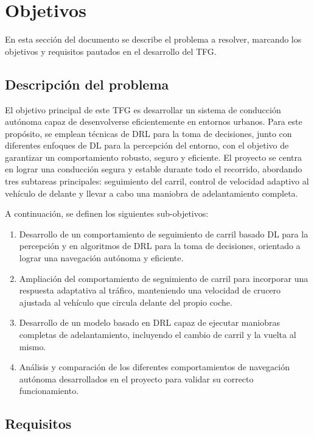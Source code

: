 \chapter{Objetivos}
\label{cap:capitulo2}

En esta sección del documento se describe el problema a resolver, marcando los objetivos y requisitos pautados en el desarrollo del \ac{TFG}.

\section{Descripción del problema}
\label{sec:descripcion}

El objetivo principal de este \ac{TFG} es desarrollar un sistema de conducción autónoma capaz de desenvolverse eficientemente en entornos urbanos. Para este propósito, se emplean técnicas de \ac{DRL} para la toma de decisiones, junto con diferentes enfoques de \ac{DL} para la percepción del entorno, con el objetivo de garantizar un comportamiento robusto, seguro y eficiente. El proyecto se centra en lograr una conducción segura y estable durante todo el recorrido, abordando tres subtareas principales: seguimiento del carril, control de velocidad adaptivo al vehículo de delante y llevar a cabo una maniobra de adelantamiento completa.

A continuación, se definen los siguientes sub-objetivos: 

\begin{enumerate}
\item Desarrollo de un comportamiento de seguimiento de carril basado \ac{DL} para la percepción y en algoritmos de \ac{DRL} para la toma de decisiones, orientado a lograr una navegación autónoma y eficiente.
\item Ampliación del comportamiento de seguimiento de carril para incorporar una respuesta adaptativa al tráfico, manteniendo una velocidad de crucero ajustada al vehículo que circula delante del propio coche.
\item Desarrollo de un modelo basado en \ac{DRL} capaz de ejecutar maniobras completas de adelantamiento, incluyendo el cambio de carril y la vuelta al mismo.
\item Análisis y comparación de los diferentes comportamientos de navegación autónoma desarrollados en el proyecto para validar su correcto funcionamiento.
\end{enumerate}

\section{Requisitos}
\label{sec:requisitos}

